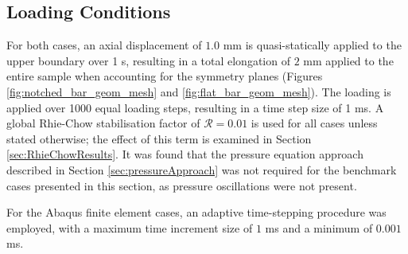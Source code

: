 \documentclass[sn-mathphys,Numbered]{sn-jnl}%
\begin{document}
\subsection{Loading Conditions}

For both cases, an axial displacement of $1.0$ mm is quasi-statically applied to the upper boundary over 1 s, resulting in a total elongation of $2$ mm applied to the entire sample when accounting for the symmetry planes (Figures \ref{fig:notched_bar_geom_mesh} and \ref{fig:flat_bar_geom_mesh}).
The loading is applied over 1000 equal loading steps, resulting in a time step size of 1 ms.
A global Rhie-Chow stabilisation factor of $\mathcal{R} = 0.01$ is used for all cases unless stated otherwise; the effect of this term is examined in Section \ref{sec:RhieChowResults}.
It was found that the pressure equation approach described in Section \ref{sec:pressureApproach} was not required for the benchmark cases presented in this section, as pressure oscillations were not present.



For the Abaqus finite element cases, an adaptive time-stepping procedure was employed, with a maximum time increment size of $1$ ms and a minimum of $0.001$ ms.
\end{document}
